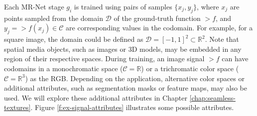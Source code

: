 


Each MR-Net stage \( g_i \) is trained using pairs of samples \(\{x_j, y_j\}\), where \( x_j \) are points sampled from the domain \(\mathcal{D}\) of the ground-truth function \(\gt{f}\), and \( y_j = \gt{f}(x_j) \in \mathcal{C} \) are corresponding values in the codomain. For example, for a square image, the domain could be defined as \(\mathcal{D} = [-1, 1]^2 \subset \mathbb{R}^{2}\). Note that spatial media objects, such as images or 3D models, may be embedded in any region of their respective spaces. During training, an image signal \(\gt{f}\) can have codomains in a monochromatic space (\(\mathcal{C} = \mathbb{R}\)) or a trichromatic color space (\(\mathcal{C} = \mathbb{R}^3\)) as the RGB. Depending on the application, alternative color spaces or additional attributes, such as segmentation masks or feature maps, may also be used. We will explore these additional attributes in Chapter \ref{chap:seamless-textures}. Figure \ref{f:ex-signal-attributes} illustrates some possible attributes.

